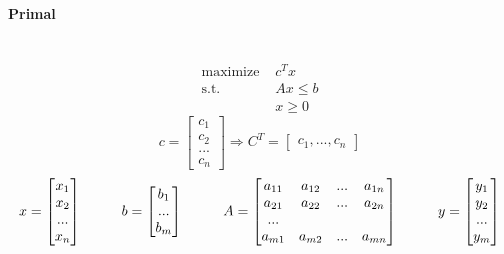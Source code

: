 \paragraph{Primal} ~ \\
\begin{align*}
\text{maximize } &c^Tx \\
\text{s.t. } & Ax \leq b \\
& x \geq 0
\end{align*}
$$c = \begin{bmatrix}
c_1 \\ c_2 \\ ... \\ c_n
\end{bmatrix} \Rightarrow C^T = \begin{bmatrix}
c_1,...,c_n
\end{bmatrix}$$
$$x = \begin{bmatrix}
x_1 \\ x_2 \\ ... \\ x_n
\end{bmatrix} \hspace*{1cm} b = \begin{bmatrix}
b_1 \\ ... \\ b_m
\end{bmatrix} \hspace{1cm} A = \begin{bmatrix}
a_{11} & a_{12} & ... & a_{1n} \\
a_{21} & a_{22} & ... & a_{2n} \\
... \\
a_{m1} & a_{m2} & ... & a_{mn}
\end{bmatrix} \hspace*{1cm} y = \begin{bmatrix}
y_1 \\ y_2 \\ ... \\ y_m
\end{bmatrix}
$$
